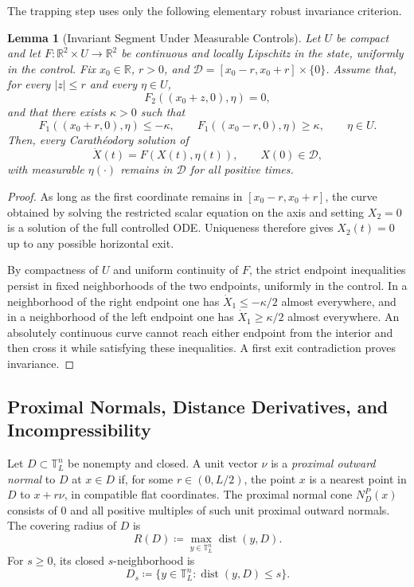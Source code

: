 \documentclass[11pt,reqno,noamsfonts]{amsart}
\newtheorem{lemma}[theorem]{Lemma}
\theoremstyle{definition}
\theoremstyle{remark}
\newcommand{\R}{\mathbb R}
\newcommand{\T}{\mathbb T}
\newcommand{\dist}{\operatorname{dist}}
\begin{document}
The trapping step uses only the following elementary robust invariance criterion.

\begin{lemma}[Invariant Segment Under Measurable Controls]\label{lem:segment-invariance-background}
Let $U$ be compact and let $F:\R^2\times U\to\R^2$ be continuous and locally Lipschitz in the state, uniformly in the control. Fix $x_0\in\R$, $r>0$, and
  $\mathcal D=[x_0-r,x_0+r]\times\{0\}$.
Assume that, for every $|z|\le r$ and every $\eta\in U$,
\[
  F_2((x_0+z,0),\eta)=0,
\]
and that there exists $\kappa>0$ such that
\[
  F_1((x_0+r,0),\eta)\le-\kappa,
  \qquad
  F_1((x_0-r,0),\eta)\ge\kappa,
  \qquad \eta\in U.
\]
Then, every Carath\'eodory solution of
\[
  \dot X(t)=F(X(t),\eta(t)),
  \qquad X(0)\in\mathcal D,
\]
with measurable $\eta(\cdot)$ remains in $\mathcal D$ for all positive times.
\end{lemma}

\begin{proof}
As long as the first coordinate remains in $[x_0-r,x_0+r]$, the curve obtained by solving the restricted scalar equation on the axis and setting $X_2=0$ is a solution of the full controlled ODE. Uniqueness therefore gives $X_2(t)=0$ up to any possible horizontal exit.

By compactness of $U$ and uniform continuity of $F$, the strict endpoint inequalities persist in fixed neighborhoods of the two endpoints, uniformly in the control. In a neighborhood of the right endpoint one has $\dot X_1\le-\kappa/2$ almost everywhere, and in a neighborhood of the left endpoint one has $\dot X_1\ge\kappa/2$ almost everywhere. An absolutely continuous curve cannot reach either endpoint from the interior and then cross it while satisfying these inequalities. A first exit contradiction proves invariance.
\end{proof}

\subsection{Proximal Normals, Distance Derivatives, and Incompressibility}\label{app:proximal-background}

Let $D\subset\T_L^n$ be nonempty and closed. A unit vector $\nu$ is a
\emph{proximal outward normal} to $D$ at $x\in D$ if, for some
$r\in(0,L/2)$, the point $x$ is a nearest point in $D$ to
$x+r\nu$, in compatible flat coordinates. The proximal normal cone
$N_D^P(x)$ consists of $0$ and all positive multiples of such unit
proximal outward normals.
The covering radius of $D$ is
\[
  R(D)\coloneqq \max_{y\in\T_L^n}\dist(y,D).
\]
For $s\ge0$, its closed $s$-neighborhood is
\[
  D_s\coloneqq \{y\in\T_L^n:\dist(y,D)\le s\}.
\]
\end{document}
